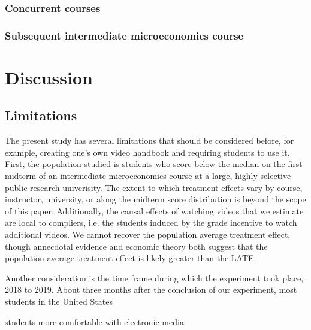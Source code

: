 \documentclass[12pt]{article}
\begin{document}
\subsubsection{Concurrent courses}

\subsubsection{Subsequent intermediate microeconomics course}




\section{Discussion} \label{discussion}

\subsection{Limitations}

The present study has several limitations that should be considered before, for example, creating one's own video handbook and requiring students to use it. First, the population studied is students who score below the median on the first midterm of an intermediate microeconomics course at a large, highly-selective public research univerisity. The extent to which treatment effects vary by course, instructor, university, or along the midterm score distribution is beyond the scope of this paper. Additionally, the causal effects of watching videos that we estimate are local to compliers, i.e. the students induced by the grade incentive to watch additional videos. We cannot recover the population average treatment effect, though annecdotal evidence and economic theory both suggest that the population average treatment effect is likely greater than the LATE.

Another consideration is the time frame during which the experiment took place, 2018 to 2019. About three months after the conclusion of our experiment, most students in the United States

students more comfortable with electronic media

\end{document}
